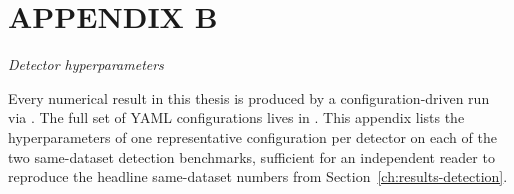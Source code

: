 \chapter*{APPENDIX B}
\label{app:hyperparams}
\begin{center}
\textit{Detector hyperparameters}
\end{center}
\vspace{0.5cm}

Every numerical result in this thesis is produced by a configuration-driven run via .  The full set of YAML configurations lives in .  This appendix lists the hyperparameters of one representative configuration per detector on each of the two same-dataset detection benchmarks, sufficient for an independent reader to reproduce the headline same-dataset numbers from Section~\ref{ch:results-detection}.

